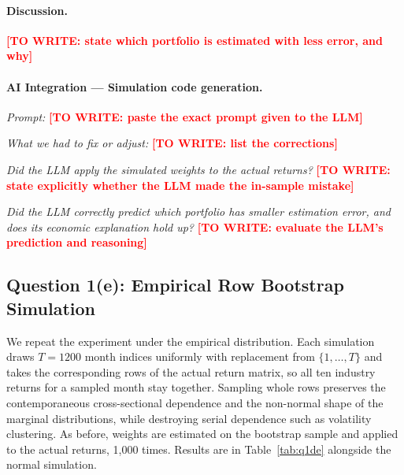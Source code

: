 \documentclass[11pt]{article}
\newcommand{\todo}[1]{\textcolor{red}{\textbf{[TO WRITE: #1]}}}
\begin{document}
\paragraph{Discussion.}
\todo{state which portfolio is estimated with less error, and why}

\paragraph{AI Integration --- Simulation code generation.}

\textit{Prompt:}
\todo{paste the exact prompt given to the LLM}

\textit{What we had to fix or adjust:}
\todo{list the corrections}

\textit{Did the LLM apply the simulated weights to the actual returns?}
\todo{state explicitly whether the LLM made the in-sample mistake}

\textit{Did the LLM correctly predict which portfolio has smaller estimation
error, and does its economic explanation hold up?}
\todo{evaluate the LLM's prediction and reasoning}

\subsection{Question 1(e): Empirical Row Bootstrap Simulation}

We repeat the experiment under the empirical distribution. Each simulation
draws $T = 1200$ month indices uniformly with replacement from
$\{1, \ldots, T\}$ and takes the corresponding rows of the actual return
matrix, so all ten industry returns for a sampled month stay together.
Sampling whole rows preserves the contemporaneous cross-sectional dependence
and the non-normal shape of the marginal distributions, while destroying
serial dependence such as volatility clustering. As before, weights are
estimated on the bootstrap sample and applied to the actual returns, 1{,}000
times. Results are in Table~\ref{tab:q1de} alongside the normal simulation.
\end{document}
